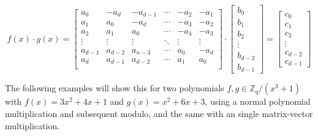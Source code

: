 $$
  f(x) \cdot g(x)
  =
  \begin{bmatrix}
    a_0     & -a_{d}  & -a_{d-1} & \cdots & -a_2   & -a_1   \\
    a_1     & a_0     & -a_{d}   & \cdots & -a_3   & -a_2   \\
    a_2     & a_1     & a_0      & \cdots & -a_4   & -a_3   \\
    \vdots  & \vdots  & \vdots   & \ddots & \vdots & \vdots \\
    a_{d-1} & a_{d-2} & a_{n-3}  & \cdots & a_0    & -a_{d} \\
    a_{d}   & a_{d-1} & a_{d-2}  & \cdots & a_1    & a_0    \\
  \end{bmatrix}
  \cdot
  \begin{bmatrix}
    b_0     \\
    b_1     \\
    b_2     \\
    \vdots  \\
    b_{d-2} \\
    b_{d-1}
  \end{bmatrix}
  = 
  \begin{bmatrix}
    c_0     \\
    c_1     \\
    c_2     \\
    \vdots  \\
    c_{d-2} \\
    c_{d-1}
  \end{bmatrix}
$$

The following examples will show this for two polynomials $f, g \in \mathbb{Z}_q/(x^3+1)$ with $f(x) = 3x^2+4x+1$ and $g(x) = x^2+6x+3$, using a normal polynomial multiplication and subsequent modulo, and the same with an single matrix-vector multiplication.

